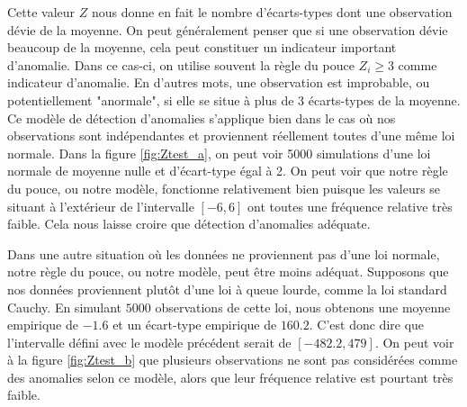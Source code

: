 Cette valeur $Z$ nous donne en fait le nombre d'écarts-types dont une observation dévie de la moyenne. On peut généralement penser que si une observation dévie beaucoup de la moyenne, cela peut constituer un indicateur important d'anomalie. Dans ce cas-ci, on utilise souvent la règle du pouce $Z_i \ge 3$ comme indicateur d'anomalie. En d'autres mots, une observation est improbable, ou potentiellement "anormale", si elle se situe à plus de 3 écarts-types de la moyenne. Ce modèle de détection d'anomalies s'applique bien dans le cas où nos observations sont indépendantes et proviennent réellement toutes d'une même loi normale. Dans la figure \ref{fig:Ztest_a}, on peut voir 5000 simulations d'une loi normale de moyenne nulle et d'écart-type égal à 2. On peut voir que notre règle du pouce, ou notre modèle, fonctionne relativement bien puisque les valeurs se situant à l'extérieur de l'intervalle $[-6, 6]$ ont toutes une fréquence relative très faible. Cela nous laisse croire que \DIFdelbegin {}\DIFdelend \DIFaddbegin {}\DIFaddend détection d'anomalies \DIFdelbegin {}\DIFdelend \DIFaddbegin {}\DIFaddend adéquate. 

Dans une autre situation où les données ne proviennent pas d'une loi normale, notre règle du pouce, ou notre modèle, peut être moins adéquat. Supposons que nos données proviennent plutôt d'une loi à queue lourde, comme la loi standard Cauchy. En simulant $5000$ observations de cette loi, nous obtenons une moyenne empirique de $-1.6$ et un écart-type empirique de $160.2$. C'est donc dire que l'intervalle défini avec le modèle précédent serait de $[-482.2, 479]$. On peut voir à la figure \ref{fig:Ztest_b} que plusieurs observations ne sont pas considérées comme des anomalies selon ce modèle, alors que leur fréquence relative est pourtant très faible.

